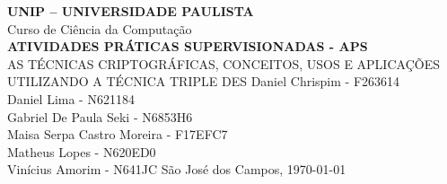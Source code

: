
\frenchspacing 

\newpage

\pretextual

\begin{capa} 
    \begin{center}
        \begin{minipage}{1\textwidth} 
            \large\centering{}
        \end{minipage}
    \end{center}
    \begin{center}
        \LARGE\textbf{UNIP – UNIVERSIDADE PAULISTA\\} 
        \LARGE Curso de Ciência da Computação\\
        \vfill
        \ABNTEXchapterfont\Large\textbf{\MakeUppercase{ATIVIDADES PRÁTICAS SUPERVISIONADAS - APS}}
        \\\small{AS TÉCNICAS CRIPTOGRÁFICAS, CONCEITOS, USOS E APLICAÇÕES\\UTILIZANDO A TÉCNICA TRIPLE DES} 
        \vfill
        \normalsize
        Daniel Chrispim - F263614\\
        Daniel Lima - N621184\\
        Gabriel De Paula Seki - N6853H6\\
        Maisa Serpa Castro Moreira - F17EFC7\\
        Matheus Lopes - N620ED0\\
        Vinícius Amorim - N641JC
        \vfill
        São José dos Campos, \today 
    \end{center}
\end{capa}

